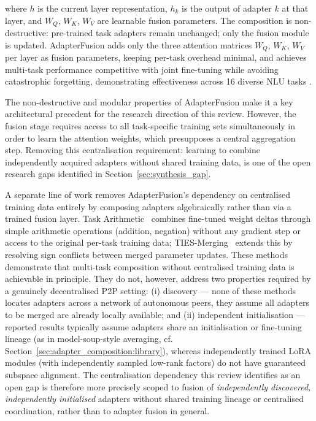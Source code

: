where $h$ is the current layer representation, $h_k$ is the output of adapter $k$ at
that layer, and $W_Q$, $W_K$, $W_V$ are learnable fusion parameters. The composition
is non-destructive: pre-trained task adapters remain unchanged; only the fusion module
is updated. AdapterFusion adds only the three attention matrices $W_Q$, $W_K$, $W_V$ per layer as fusion parameters, keeping per-task overhead minimal, and achieves multi-task performance
competitive with joint fine-tuning while avoiding catastrophic forgetting, demonstrating
effectiveness across 16 diverse NLU tasks \cite{Pfeiffer2021fusion}.

The non-destructive and modular properties of AdapterFusion make it a key architectural
precedent for the research direction of this review. However, the fusion stage requires
access to all task-specific training sets simultaneously in order to learn the attention
weights, which presupposes a central aggregation step. Removing this centralisation
requirement: learning to combine independently acquired adapters without
shared training data, is one of the open research gaps identified in Section~\ref{sec:synthesis_gap}.

A separate line of work removes AdapterFusion's dependency on centralised training data
entirely by composing adapters algebraically rather than via a trained fusion layer. Task
Arithmetic~\cite{Ilharco2023TaskArithmetic} combines fine-tuned weight deltas through simple
arithmetic operations (addition, negation) without any gradient step or access to the
original per-task training data; TIES-Merging~\cite{Yadav2023TIES} extends this by resolving
sign conflicts between merged parameter updates. These methods demonstrate that multi-task
composition without centralised training data is achievable in principle. They do not,
however, address two properties required by a genuinely decentralised P2P setting: (i)
discovery --- none of these methods locates adapters across a network of autonomous peers,
they assume all adapters to be merged are already locally available; and (ii) independent
initialisation --- reported results typically assume adapters share an initialisation or
fine-tuning lineage (as in model-soup-style averaging, cf. Section~\ref{sec:adapter_composition:library}),
whereas independently trained LoRA modules (with independently sampled low-rank factors)
do not have guaranteed subspace alignment. The centralisation dependency this review
identifies as an open gap is therefore more precisely scoped to fusion of \emph{independently
discovered, independently initialised} adapters without shared training lineage or
centralised coordination, rather than to adapter fusion in general.

